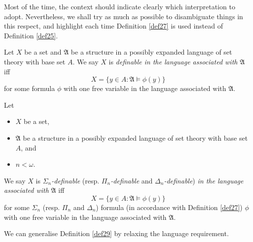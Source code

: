 \documentclass[12pt]{article}
\numberwithin{equation}{section}
\begin{document}
Most of the time, the context should indicate clearly which interpretation to adopt. Nevertheless, we shall try as much as possible to disambiguate things in this respect, and highlight each time Definition \ref{def27} is used instead of Definition \ref{def25}.

\begin{defi}
Let $X$ be a set and $\mathfrak{A}$ be a structure in a possibly expanded language of set theory with base set $A$. We say $X$ is \emph{definable in the language associated with} $\mathfrak{A}$ iff $$X = \{y \in A : \mathfrak{A} \models \phi(y)\}$$ for some formula $\phi$ with one free variable in the language associated with $\mathfrak{A}$.
\end{defi}

\begin{defi}\label{def29}
Let 
\begin{itemize}
    \item $X$ be a set,
    \item $\mathfrak{A}$ be a structure in a possibly expanded language of set theory with base set $A$, and
    \item $n < \omega$. 
\end{itemize} 
We say $X$ is $\Sigma_n$\emph{-definable} (resp. $\Pi_n$\emph{-definable} and $\Delta_n$\emph{-definable}) \emph{in the language associated with} $\mathfrak{A}$ iff $$X = \{y \in A : \mathfrak{A} \models \phi(y)\}$$ for some $\Sigma_n$ (resp. $\Pi_n$ and $\Delta_n$) formula (in accordance with Definition \ref{def27}) $\phi$ with one free variable in the language associated with $\mathfrak{A}$.
\end{defi}

We can generalise Definition \ref{def29} by relaxing the language requirement.
\end{document}
